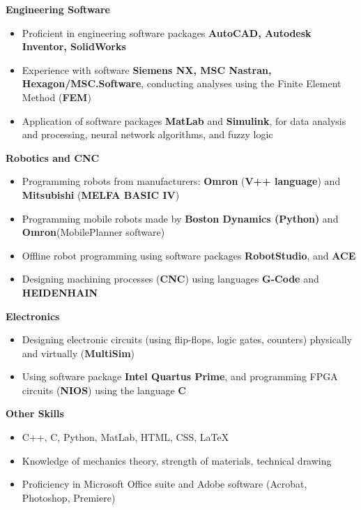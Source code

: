 \documentclass[a4paper,10pt]{extarticle}
\begin{document}
\noindent
\textbf{{Engineering Software}}
\vspace{-0.2cm}
\begin{itemize}
\item Proficient in engineering software packages \textbf{AutoCAD, Autodesk Inventor, SolidWorks}
\item Experience with software \textbf{Siemens NX, MSC Nastran, Hexagon/MSC.Software}, conducting analyses using the Finite Element Method (\textbf{FEM})
\item Application of software packages \textbf{MatLab} and \textbf{Simulink}, for data analysis and processing, neural network algorithms, and fuzzy logic
\end{itemize}

\vspace{-0.2cm}
\noindent
\textbf{{Robotics and CNC}}
\vspace{-0.2cm}
\begin{itemize}
\item Programming robots from manufacturers: \textbf{Omron} (\textbf{V++ language}) and \textbf{Mitsubishi} (\textbf{MELFA BASIC IV})
\item Programming mobile robots made by \textbf{Boston Dynamics (Python)} and \textbf{Omron}(MobilePlanner software)
\item Offline robot programming using software packages \textbf{RobotStudio}, and \textbf{ACE}
\item Designing machining processes (\textbf{CNC}) using languages \textbf{G-Code} and \textbf{HEIDENHAIN}
\end{itemize}

\vspace{-0.2cm}
\noindent
\textbf{{Electronics}}
\vspace{-0.2cm}
\begin{itemize}
\item Designing electronic circuits (using flip-flops, logic gates, counters) physically and virtually (\textbf{MultiSim})
\item Using software package \textbf{Intel Quartus Prime}, and programming FPGA circuits (\textbf{NIOS}) using the language \textbf{C}
\end{itemize}

\vspace{-0.2cm}
\noindent
\textbf{{Other Skills}}
\vspace{-0.2cm}
\begin{itemize}
\item C++, C, Python, MatLab, HTML, CSS, LaTeX
\item Knowledge of mechanics theory, strength of materials, technical drawing
\item Proficiency in Microsoft Office suite and Adobe software (Acrobat, Photoshop, Premiere)

\end {itemize}
\end{document}
